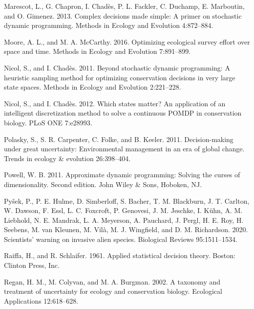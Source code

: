 \documentclass[
  11pt,
  a4paper,
]{article}
\newlength{\cslhangindent}
\newenvironment{CSLReferences}[2] %
 {\begin{list}{}{%
  \setlength{\itemindent}{0pt}
  \setlength{\leftmargin}{0pt}
  \setlength{\parsep}{0pt}
  \ifodd #1
   \setlength{\leftmargin}{\cslhangindent}
   \setlength{\itemindent}{-1\cslhangindent}
  \fi
  \setlength{\itemsep}{#2\baselineskip}}}
 {\end{list}}
\begin{document}
\begin{CSLReferences}{1}{0}
Marescot, L., G. Chapron, I. Chadès, P. L. Fackler, C. Duchamp, E. Marboutin, and O. Gimenez. 2013. Complex decisions made simple: A primer on stochastic dynamic programming. Methods in Ecology and Evolution 4:872--884.

Moore, A. L., and M. A. McCarthy. 2016. Optimizing ecological survey effort over space and time. Methods in Ecology and Evolution 7:891--899.

Nicol, S., and I. Chadès. 2011. Beyond stochastic dynamic programming: A heuristic sampling method for optimizing conservation decisions in very large state spaces. Methods in Ecology and Evolution 2:221--228.

Nicol, S., and I. Chadès. 2012. Which states matter? An application of an intelligent discretization method to solve a continuous {POMDP} in conservation biology. PLoS ONE 7:e28993.

Polasky, S., S. R. Carpenter, C. Folke, and B. Keeler. 2011. Decision-making under great uncertainty: Environmental management in an era of global change. Trends in ecology \& evolution 26:398--404.

Powell, W. B. 2011. Approximate dynamic programming: Solving the curses of dimensionality. Second edition. John Wiley \& Sons, Hoboken, NJ.

Pyšek, P., P. E. Hulme, D. Simberloff, S. Bacher, T. M. Blackburn, J. T. Carlton, W. Dawson, F. Essl, L. C. Foxcroft, P. Genovesi, J. M. Jeschke, I. Kühn, A. M. Liebhold, N. E. Mandrak, L. A. Meyerson, A. Pauchard, J. Pergl, H. E. Roy, H. Seebens, M. van Kleunen, M. Vilà, M. J. Wingfield, and D. M. Richardson. 2020. Scientists' warning on invasive alien species. Biological Reviews 95:1511--1534.

Raiffa, H., and R. Schlaifer. 1961. Applied statistical decision theory. Boston: Clinton Press, Inc.

Regan, H. M., M. Colyvan, and M. A. Burgman. 2002. A taxonomy and treatment of uncertainty for ecology and conservation biology. Ecological Applications 12:618--628.


\end{CSLReferences}
\end{document}
